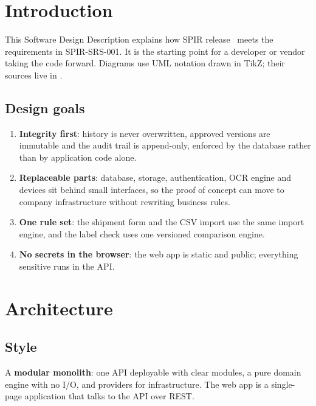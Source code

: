 \documentclass[11pt,a4paper]{article}
\begin{document}
\DocumentControl
\tableofcontents
\clearpage

\section{Introduction}
This Software Design Description explains how SPIR release \SPIRRelease\ meets the requirements in SPIR-SRS-001. It is
the starting point for a developer or vendor taking the code forward. Diagrams use UML notation drawn in TikZ; their
sources live in .

\subsection{Design goals}
\begin{enumerate}
  \item \textbf{Integrity first}: history is never overwritten, approved versions are immutable and the audit trail is
    append-only, enforced by the database rather than by application code alone.
  \item \textbf{Replaceable parts}: database, storage, authentication, OCR engine and devices sit behind small
    interfaces, so the proof of concept can move to company infrastructure without rewriting business rules.
  \item \textbf{One rule set}: the shipment form and the CSV import use the same import engine, and the label check uses
    one versioned comparison engine.
  \item \textbf{No secrets in the browser}: the web app is static and public; everything sensitive runs in the API.
\end{enumerate}

\section{Architecture}
\subsection{Style}
A \textbf{modular monolith}: one API deployable with clear modules, a pure domain engine with no I/O, and providers
for infrastructure. The web app is a single-page application that talks to the API over REST.
\end{document}
